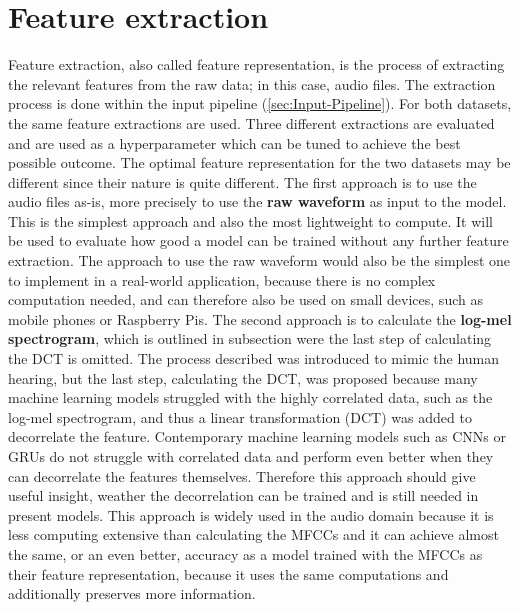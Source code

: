 \section{Feature extraction}
\label{sec:Feature-Extraction}
Feature extraction, also called feature representation, is the process of extracting the relevant features from the raw data; in this case, audio files. The extraction process is done within the input pipeline (\ref{sec:Input-Pipeline}). For both datasets, the same feature extractions are used. Three different extractions are evaluated and are used as a hyperparameter which can be tuned to achieve the best possible outcome. The optimal feature representation for the two datasets may be different since their nature is quite different.
\newline
\newline
The first approach is to use the audio files as-is, more precisely to use the \textbf{raw waveform} as input to the model. This is the simplest approach and also the most lightweight to compute. It will be used to evaluate how good a model can be trained without any further feature extraction. The approach to use the raw waveform would also be the simplest one to implement in a real-world application, because there is no complex computation needed, and can therefore also be used on small devices, such as mobile phones or Raspberry Pis.
\newline
\newline
The second approach is to calculate the \textbf{log-mel spectrogram}, which is outlined in subsection  were the last step of calculating the \gls{DCT} is omitted. The process described was introduced to mimic the human hearing, but the last step, calculating the \gls{DCT}, was proposed because many machine learning models struggled with the highly correlated data, such as the log-mel spectrogram, and thus a linear transformation (\gls{DCT}) was added to decorrelate the feature. Contemporary machine learning models such as \glspl{CNN} or \glspl{GRU} do not struggle with correlated data and perform even better when they can decorrelate the features themselves. Therefore this approach should give useful insight, weather the decorrelation can be trained and is still needed in present models.
\newline
This approach is widely used in the audio domain because it is less computing extensive than calculating the \glspl{MFCC} and it can achieve almost the same, or an even better, accuracy as a model trained with the \glspl{MFCC} as their feature representation, because it uses the same computations and additionally preserves more information.
